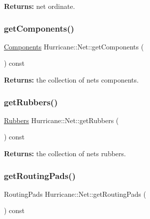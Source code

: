 {\bfseries Returns\+:} net ordinate. \mbox{\label{classHurricane_1_1Net_a1e2d7ef9bab15694870a605e514f26e8}} 
\subsubsection{\texorpdfstring{get\+Components()}{getComponents()}}
{\footnotesize\ttfamily \mbox{\hyperlink{namespaceHurricane_a7d26d99aeb5dd6d70d51bd35d2473e72}{Components}} Hurricane\+::\+Net\+::get\+Components (\begin{DoxyParamCaption}{ }\end{DoxyParamCaption}) const\hspace{0.3cm}{\ttfamily [inline]}}

{\bfseries Returns\+:} the collection of net\textquotesingle{}s components. \mbox{\label{classHurricane_1_1Net_a6ddbe2697a7fd7a7cd359f97b2ad0223}} 
\subsubsection{\texorpdfstring{get\+Rubbers()}{getRubbers()}}
{\footnotesize\ttfamily \mbox{\hyperlink{namespaceHurricane_af8923abd57508cc44931a00d61b564ad}{Rubbers}} Hurricane\+::\+Net\+::get\+Rubbers (\begin{DoxyParamCaption}{ }\end{DoxyParamCaption}) const\hspace{0.3cm}{\ttfamily [inline]}}

{\bfseries Returns\+:} the collection of net\textquotesingle{}s rubbers. \mbox{\label{classHurricane_1_1Net_a1078d55acf3efa0b3c23cd345cae87fa}} 
\subsubsection{\texorpdfstring{get\+Routing\+Pads()}{getRoutingPads()}}
{\footnotesize\ttfamily Routing\+Pads Hurricane\+::\+Net\+::get\+Routing\+Pads (\begin{DoxyParamCaption}{ }\end{DoxyParamCaption}) const}


